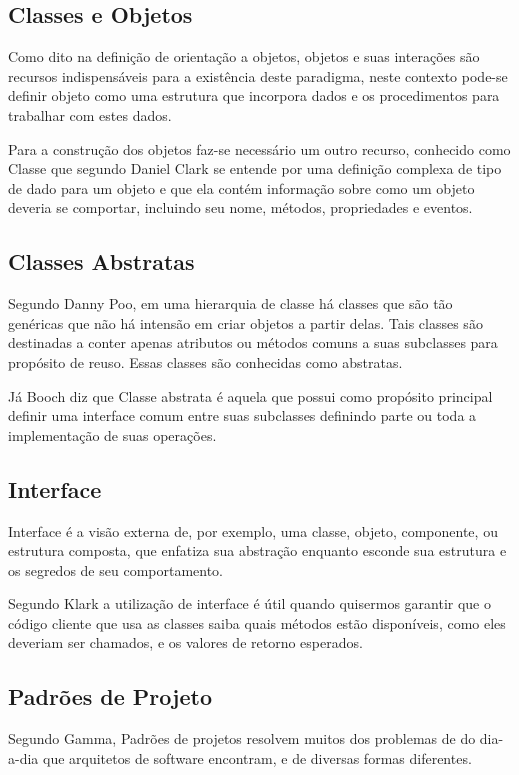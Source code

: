 \subsection{Classes e Objetos}	

Como dito na definição de orientação a objetos, objetos e suas interações  são recursos indispensáveis para a existência deste paradigma, neste contexto pode-se definir objeto como uma estrutura que incorpora dados e os procedimentos para trabalhar com estes dados.

Para a construção dos objetos faz-se necessário  um outro recurso, conhecido como Classe que segundo Daniel Clark se entende por uma definição complexa de tipo de dado para um objeto e que ela contém informação sobre como um objeto deveria se comportar, incluindo seu nome, métodos, propriedades e eventos.\cite{dan}


\subsection{Classes Abstratas}	

Segundo Danny Poo, em uma hierarquia de classe há classes que são tão genéricas que não há intensão em criar objetos a partir delas. Tais classes são destinadas a conter apenas atributos ou métodos comuns a suas subclasses para propósito de reuso. Essas classes são conhecidas como abstratas. \cite{dany}
  
Já Booch diz que Classe abstrata é aquela que possui como propósito principal definir uma interface comum entre suas subclasses definindo parte ou toda a implementação de suas operações.  \cite{gra}


\subsection{Interface}	
Interface é a visão externa de, por exemplo, uma classe, objeto, componente, ou estrutura composta, que enfatiza sua abstração enquanto esconde sua estrutura e os segredos de seu comportamento. \cite{gra}  

Segundo Klark  a utilização de interface é útil quando quisermos garantir que o código cliente que usa as classes saiba quais métodos estão disponíveis, como eles deveriam ser chamados, e os valores de retorno esperados. \cite{dan}

\subsection{Padrões de Projeto}	
Segundo Gamma, Padrões de projetos resolvem muitos dos problemas de  do dia-a-dia que arquitetos de software encontram, e de diversas formas diferentes. \cite{gram}   


